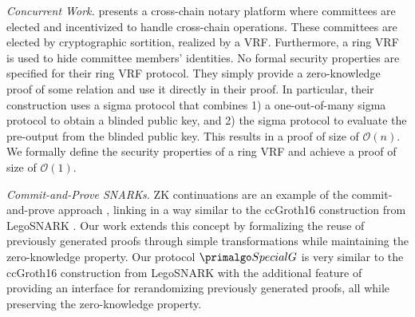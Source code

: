 \smallskip
\noindent\textit{Concurrent Work.} 
\cite{YinZXLR22} presents a cross-chain notary platform where
committees are elected and incentivized to handle cross-chain operations.
These committees are elected by cryptographic sortition, realized by a VRF.
Furthermore, a ring VRF is used to hide committee members' identities.
No formal security properties are specified for their ring VRF protocol.
They simply provide a zero-knowledge proof of some relation and use it directly in their proof.
In particular, their construction uses a sigma protocol that combines 1) a one-out-of-many sigma protocol \cite{GrothK15} to obtain a blinded public key, and 2) the sigma protocol to evaluate the pre-output from the blinded public key. This results in a proof of size of $\mathcal{O}(n)$.
We formally define the security properties of a ring VRF and achieve a proof of size of $\mathcal{O}(1)$.

\smallskip
\noindent\textit{Commit-and-Prove SNARKs.} ZK continuations are an example of the commit-and-prove approach \cite{LegoSNARK}, linking  in a way similar to the ccGroth16 construction from LegoSNARK \cite{LegoSNARK}. Our work extends this concept by formalizing the reuse of previously generated proofs through simple transformations while maintaining the zero-knowledge property. Our protocol $ \SpecialG $ is very similar to the ccGroth16 construction from LegoSNARK \cite{LegoSNARK} with the additional feature of providing an interface for rerandomizing previously generated proofs, all while preserving the zero-knowledge property. 

